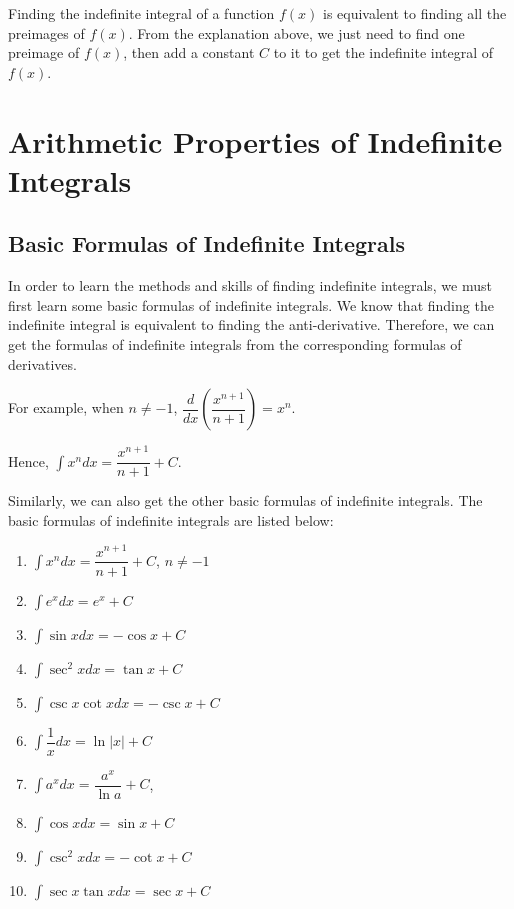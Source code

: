 \documentclass{report}
\begin{document}
Finding the indefinite integral of a function $f(x)$ is equivalent to finding
all the preimages of $f(x)$. From the explanation above, we just need to find
one preimage of $f(x)$, then add a constant $C$ to it to get the indefinite
integral of $f(x)$.

\section{Arithmetic Properties of Indefinite Integrals}

\subsection*{Basic Formulas of Indefinite Integrals}

In order to learn the methods and skills of finding indefinite integrals, we
must first learn some basic formulas of indefinite integrals. We know that
finding the indefinite integral is equivalent to finding the anti-derivative.
Therefore, we can get the formulas of indefinite integrals from the
corresponding formulas of derivatives.

For example, when $n \neq -1$, $\dfrac{d}{dx}\left(\dfrac{x^{n+1}}{n+1}\right)
    = x^n$.

Hence, $\displaystyle\int x^{n}dx = \dfrac{x^{n+1}}{n+1} + C$.

Similarly, we can also get the other basic formulas of indefinite integrals.
The basic formulas of indefinite integrals are listed below:
\begin{mdframed}[style=MyFrame]
    \vspace{-0.5cm}
    \begin{multicols}{2}
        \begin{enumerate}[label = ]
            \item $\displaystyle\int x^{n}dx = \dfrac{x^{n+1}}{n+1} + C$, $n \neq -1$
            \item $\displaystyle\int e^{x}dx = e^{x} + C$
            \item $\displaystyle\int \sin xdx = -\cos x + C$
            \item $\displaystyle\int \sec^2xdx = \tan x + C$
            \item $\displaystyle\int \csc x\cot xdx = -\csc x + C$
            \item $\displaystyle\int \dfrac{1}{x}dx = \ln|x| + C$
            \item $\displaystyle\int a^{x}dx = \dfrac{a^x}{\ln a} + C$,
            \item $\displaystyle\int \cos xdx = \sin x + C$
            \item $\displaystyle\int \csc^2xdx = -\cot x + C$
            \item $\displaystyle\int \sec x\tan xdx = \sec x + C$
        \end{enumerate}
    \end{multicols}
\end{mdframed}
\end{document}
